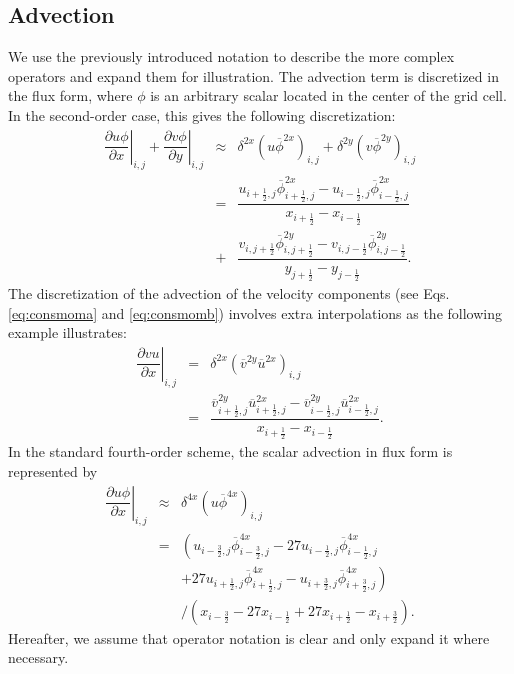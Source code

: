 \documentclass[gmd,manuscript]{copernicus}
\begin{document}
\subsection{Advection}
We use the previously introduced notation to describe the more complex operators and expand them for illustration. The advection term is discretized in the flux form, where $\phi$ is an arbitrary scalar located in the center of the grid cell. In the second-order case, this gives the following discretization:
\begin{eqnarray}
\nonumber
\left. \dfrac{\partial u \phi}{\partial x}\right|_{i,j} + \left. \dfrac{\partial v \phi}{\partial y} \right|_{i,j} & \approx & 
\delta^{2x} \left( u \overline{\phi}^{2x} \right)_{i,j} + \delta^{2y} \left( v \overline{\phi}^{2y} \right)_{i,j} \\ 
\nonumber
& = & \dfrac{ u_{i+\frac{1}{2},j} \overline{\phi}^{2x}_{i+\frac{1}{2},j} - u_{i-\frac{1}{2},j} \overline{\phi}^{2x}_{i-\frac{1}{2},j} }
            { x_{i+\frac{1}{2}} - x_{i-\frac{1}{2}} }\\
& + & \dfrac{ v_{i,j+\frac{1}{2}} \overline{\phi}^{2y}_{i,j+\frac{1}{2}} - v_{i,j-\frac{1}{2}} \overline{\phi}^{2y}_{i,j-\frac{1}{2}} }
            { y_{j+\frac{1}{2}} - y_{j-\frac{1}{2}} }.
\end{eqnarray}
The discretization of the advection of the velocity components (see Eqs. \ref{eq:consmoma} and \ref{eq:consmomb}) involves extra interpolations as the following example illustrates:
\begin{eqnarray}
\nonumber
\left. \dfrac{\partial v u}{\partial x} \right|_{i,j} & = & \delta^{2x} \left( \overline{v}^{2y} \overline{u}^{2x} \right)_{i,j} \\
& = & \dfrac{ \overline{v}^{2y}_{i+\frac{1}{2},j} \overline{u}^{2x}_{i+\frac{1}{2},j} - \overline{v}^{2y}_{i-\frac{1}{2},j} \overline{u}^{2x}_{i-\frac{1}{2},j} }
      { x_{i+\frac{1}{2}} - x_{i-\frac{1}{2}} }.\label{eq:advec2u}
\end{eqnarray}
In the standard fourth-order scheme, the scalar advection in flux form is represented by
\begin{eqnarray}
\nonumber
\left. \dfrac{\partial u \phi}{\partial x} \right|_{i,j} & \approx & \delta^{4x} \left( u \overline{\phi}^{4x} \right)_{i,j} \\
\nonumber
& = & \left( u_{i-\frac{3}{2},j} \overline{\phi}^{4x}_{i-\frac{3}{2},j} - 27 u_{i-\frac{1}{2},j} \overline{\phi}^{4x}_{i-\frac{1}{2},j} \right.\\
\nonumber
&   &\left. + 27 u_{i+\frac{1}{2},j} \overline{\phi}^{4x}_{i+\frac{1}{2},j} - u_{i+\frac{3}{2},j} \overline{\phi}^{4x}_{i+\frac{3}{2},j} \right)\\
&   &\slash \left( x_{i-\frac{3}{2}} - 27 x_{i-\frac{1}{2}} + 27 x_{i+\frac{1}{2}} - x_{i+\frac{3}{2}} \right).
\end{eqnarray}
Hereafter, we assume that operator notation is clear and only expand it where necessary.
\end{document}
